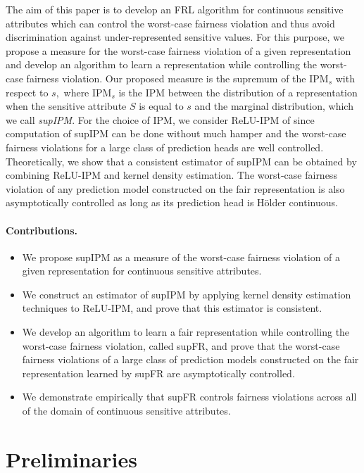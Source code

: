 \documentclass{article} %
\begin{document}
The aim of this paper is to develop an FRL algorithm for continuous sensitive attributes which
can control the worst-case fairness violation and thus avoid discrimination against under-represented sensitive values.
For this purpose, we propose a measure for the worst-case fairness violation of a given representation and
develop an algorithm to learn a representation while controlling  
the worst-case fairness violation. Our proposed measure is the supremum of the IPM$_s$ with respect to $s,$
where IPM$_s$ is the IPM between the distribution of a representation when the sensitive attribute $S$ is equal to $s$
and the marginal distribution, which we call \emph{supIPM}.
For the choice of IPM,
we consider ReLU-IPM of \citet{park2026relu} since  
computation of supIPM can be done without much hamper and the worst-case fairness violations for a large class
of prediction heads are well controlled.
Theoretically, we show that a consistent estimator of supIPM can be obtained by combining ReLU-IPM and kernel density estimation.
The worst-case fairness violation of any prediction model constructed on the fair representation is also asymptotically controlled as long as its prediction head is H\"{o}lder continuous.

\paragraph{Contributions.}
\begin{itemize}
  \item We propose supIPM as a measure of the worst-case fairness violation of a given representation
  for continuous sensitive attributes.
  \item We construct an estimator of supIPM by applying kernel density estimation techniques
  to ReLU-IPM, and prove that this estimator is consistent. 
  \item We develop an algorithm to learn a fair representation while controlling the worst-case fairness violation, called
  supFR, and prove that the worst-case fairness violations of a large class of prediction models constructed on the fair representation learned by supFR are asymptotically controlled.
  \item We demonstrate empirically that supFR controls fairness violations 
across all of the domain of continuous sensitive attributes.
\end{itemize}

\section{Preliminaries}
\label{sec:preliminaries}
\end{document}
